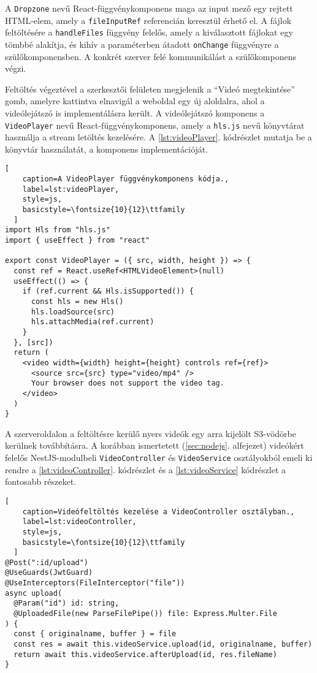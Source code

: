 A \verb|Dropzone| nevű React-függvénykomponens maga az input mező egy rejtett HTML-elem, amely a \verb|fileInputRef| referencián keresztül érhető el. A fájlok feltöltésére a \verb|handleFiles| függvény felelős, amely a kiválasztott fájlokat egy tömbbé alakítja, és kihív a paraméterben átadott \verb|onChange| függvényre a szülőkomponensben. A konkrét szerver felé kommunikálást a szülőkomponens végzi.

Feltöltés végeztével a szerkesztői felületen megjelenik a ``Videó megtekintése'' gomb, amelyre kattintva elnavigál a weboldal egy új aloldalra, ahol a videólejátszó is implementálásra került. A videólejátszó komponens a \verb|VideoPlayer| nevű React-függvénykomponens, amely a \verb|hls.js| nevű könyvtárat használja a stream letöltés kezelésére. A \ref{lst:videoPlayer}. kódrészlet mutatja be a könyvtár használatát, a komponens implementációját.

\begin{minipage}{0.92\textwidth}
  \begin{lstlisting}[
    caption=A VideoPlayer függvénykomponens kódja.,
    label=lst:videoPlayer,
    style=js,
    basicstyle=\fontsize{10}{12}\ttfamily
  ]
import Hls from "hls.js"
import { useEffect } from "react"

export const VideoPlayer = ({ src, width, height }) => {
  const ref = React.useRef<HTMLVideoElement>(null)
  useEffect(() => {
    if (ref.current && Hls.isSupported()) {
      const hls = new Hls()
      hls.loadSource(src)
      hls.attachMedia(ref.current)
    }
  }, [src])
  return (
    <video width={width} height={height} controls ref={ref}>
      <source src={src} type="video/mp4" />
      Your browser does not support the video tag.
    </video>
  )
}
\end{lstlisting}
\end{minipage}

A szerveroldalon a feltöltésre kerülő nyers videók egy arra kijelölt S3-vödörbe kerülnek továbbításra. A korábban ismertetett (\ref{sec:nodejs}. alfejezet) videókért felelős NestJS-modulbeli \verb|VideoController| és \verb|VideoService| osztályokból emeli ki rendre a \ref{lst:videoController}. kódrészlet és a \ref{lst:videoService} kódrészlet a fontosabb részeket.

\begin{minipage}{0.92\textwidth}
  \begin{lstlisting}[
    caption=Videófeltöltés kezelése a VideoController osztályban.,
    label=lst:videoController,
    style=js,
    basicstyle=\fontsize{10}{12}\ttfamily
  ]
@Post(":id/upload")
@UseGuards(JwtGuard)
@UseInterceptors(FileInterceptor("file"))
async upload(
  @Param("id") id: string,
  @UploadedFile(new ParseFilePipe()) file: Express.Multer.File
) {
  const { originalname, buffer } = file
  const res = await this.videoService.upload(id, originalname, buffer)
  return await this.videoService.afterUpload(id, res.fileName)
}
\end{lstlisting}
\end{minipage}

